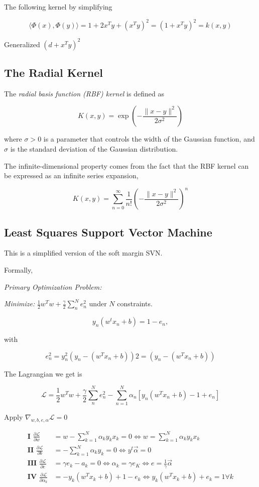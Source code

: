 The following kernel by simplifying

\[
    \langle \Phi(x), \Phi(y)\rangle = 1 + 2x^T y + (x^Ty)^2 = (1 + x^Ty)^2 = k(x,y)
\]

Generalized \((d + x^Ty)^2 \)

\subsection{The Radial Kernel}

The \emph{radial basis function (RBF) kernel} is defined as 

\[
    K(x, y) = \exp\left(- \frac{\|x - y\|^2}{2\sigma^2}\right)
\]

where \(\sigma > 0\) is a parameter that controls the width of the Gaussian function, and 
\(\sigma\) is the standard deviation of the Gaussian distribution.

The infinite-dimensional property comes from the fact that the RBF kernel can be expressed as an infinite series expansion,

\[
    K(x, y) = \sum_{n=0}^{\infty} \frac{1}{n!} \left(-\frac{\|x - y\|^2}{2\sigma^2}\right)^n
\]

\subsection{Least Squares Support Vector Machine}

This is a simplified version of the soft margin SVN. 

Formally, 

\emph{Primary Optimization Problem:}

\emph{Minimize:} \(\frac{1}{2} w^T w + \frac{\gamma}{2} \sum_n^N e_n^2\) under \(N\) constraints.

\[
    y_n(w^t x_n + b) = 1 - e_n, 
\]

with 

\[
    e_n^2 = y_n^2 (y_n - (w^T x_n + b))2 = (y_n - (w^T x_n + b))
\]

The Lagrangian we get is 

\[
    \mathcal{L} = \frac{1}{2} w^T w + \frac{\gamma}{2} \sum_n^N e_n^2 - \sum_{n = 1}^{N} \alpha_n [y_n (w^T x_n + b) - 1 + e_n]
\]

Apply \(\nabla_{w, b, e, \alpha} \mathcal{L} = 0\)

\begin{align*}
    \textbf{I } \frac{\partial \mathcal{L}}{\partial w} &= w - \sum_{k = 1}^{N} \alpha_k y_k x_k = 0 \iff w = \sum_{k = 1}^{N} \alpha_k y_k x_k \\ 
    \textbf{II } \frac{\partial \mathcal{L}}{\partial b} &= - \sum_{k = 1}^{N} \alpha_k y_k = 0 \iff  y^t \vec{\alpha} = 0 \\ 
    \textbf{III } \frac{\partial \mathcal{L}}{\partial e} &= \gamma e_k - a_k  =0 \iff \alpha_k = \gamma e_K  \iff e = \frac{1}{\gamma} \vec{\alpha}\\ 
    \textbf{IV } \frac{\partial \mathcal{L}}{\partial \alpha_k} &= - y_k (w^T x_k + b) + 1 - e_k \iff y_k (w^T x_k + b) + e_k = 1 \forall k
\end{align*}

